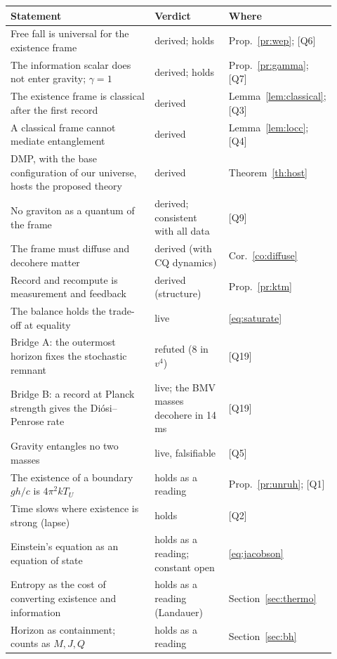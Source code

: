 \documentclass[11pt,a4paper]{article}
\theoremstyle{definition}
\theoremstyle{remark}
\newcommand{\chk}[1]{\textsf{[#1]}}
\theoremstyle{definition}
\begin{document}
\begin{center}\small
\begin{longtable}{@{}p{0.5\linewidth}p{0.24\linewidth}p{0.18\linewidth}@{}}
\toprule
Statement & Verdict & Where \\
\midrule
\endhead
Free fall is universal for the existence frame & derived; holds & Prop.~\ref{pr:wep}; \chk{Q6} \\
The information scalar does not enter gravity; $\gamma=1$ & derived; holds & Prop.~\ref{pr:gamma}; \chk{Q7} \\
The existence frame is classical after the first record & derived & Lemma~\ref{lem:classical}; \chk{Q3} \\
A classical frame cannot mediate entanglement & derived & Lemma~\ref{lem:locc}; \chk{Q4} \\
DMP, with the base configuration of our universe, hosts the proposed theory & derived & Theorem~\ref{th:host} \\
No graviton as a quantum of the frame & derived; consistent with all data & \chk{Q9} \\
The frame must diffuse and decohere matter & derived (with CQ dynamics) & Cor.~\ref{co:diffuse} \\
Record and recompute is measurement and feedback & derived (structure) & Prop.~\ref{pr:ktm} \\
The balance holds the trade-off at equality & live & \eqref{eq:saturate} \\
Bridge A: the outermost horizon fixes the stochastic remnant & refuted (8 in $v^4$) & \chk{Q19} \\
Bridge B: a record at Planck strength gives the Di\'osi--Penrose rate & live; the BMV masses decohere in 14\,ms & \chk{Q19} \\
Gravity entangles no two masses & live, falsifiable & \chk{Q5} \\
The existence of a boundary $gh/c$ is $4\pi^2kT_U$ & holds as a reading & Prop.~\ref{pr:unruh}; \chk{Q1} \\
Time slows where existence is strong (lapse) & holds & \chk{Q2} \\
Einstein's equation as an equation of state & holds as a reading; constant open & \eqref{eq:jacobson} \\
Entropy as the cost of converting existence and information & holds as a reading (Landauer) & Section~\ref{sec:thermo} \\
Horizon as containment; counts as $M,J,Q$ & holds as a reading & Section~\ref{sec:bh} \\

\end{longtable}
\end{center}
\end{document}
